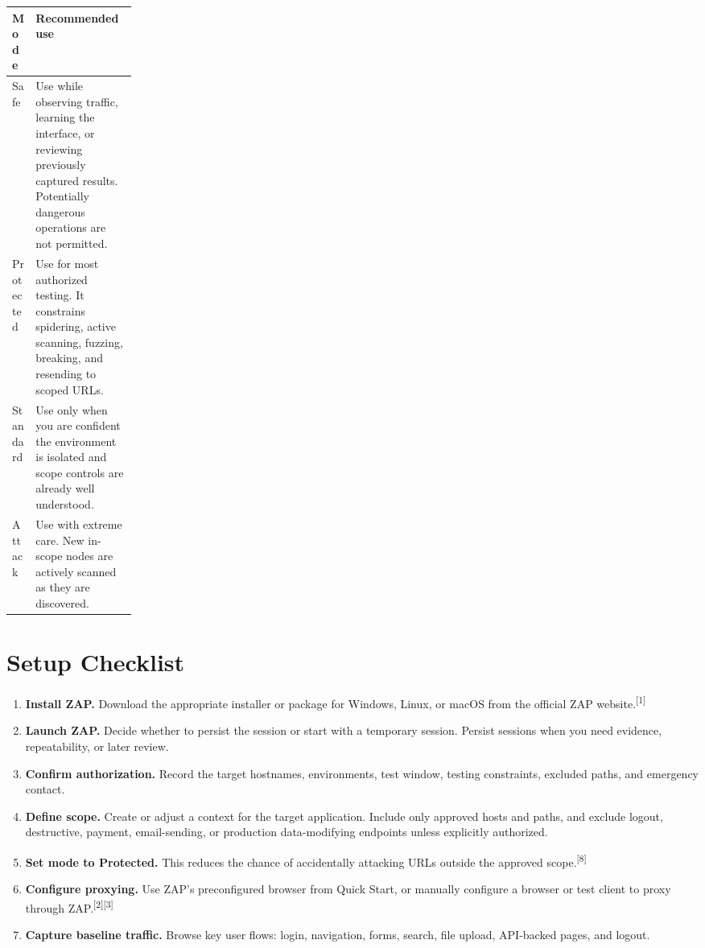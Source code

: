 \documentclass[11pt]{article}
\providecommand{\term}[1]{\textbf{#1}}
\newcommand{\source}[1]{\textsuperscript{[#1]}}
\begin{document}
\begin{tabularx}{\linewidth}{@{}p{0.18\linewidth}Y@{}}
\toprule
\textbf{Mode} & \textbf{Recommended use} \\
\midrule
Safe & Use while observing traffic, learning the interface, or reviewing previously captured results. Potentially dangerous operations are not permitted. \\
Protected & Use for most authorized testing. It constrains spidering, active scanning, fuzzing, breaking, and resending to scoped URLs. \\
Standard & Use only when you are confident the environment is isolated and scope controls are already well understood. \\
Attack & Use with extreme care. New in-scope nodes are actively scanned as they are discovered. \\
\bottomrule
\end{tabularx}

\section{Setup Checklist}

\begin{enumerate}
  \item \term{Install ZAP.} Download the appropriate installer or package for Windows, Linux, or macOS from the official ZAP website.\source{1}
  \item \term{Launch ZAP.} Decide whether to persist the session or start with a temporary session. Persist sessions when you need evidence, repeatability, or later review.
  \item \term{Confirm authorization.} Record the target hostnames, environments, test window, testing constraints, excluded paths, and emergency contact.
  \item \term{Define scope.} Create or adjust a context for the target application. Include only approved hosts and paths, and exclude logout, destructive, payment, email-sending, or production data-modifying endpoints unless explicitly authorized.
  \item \term{Set mode to Protected.} This reduces the chance of accidentally attacking URLs outside the approved scope.\source{8}
  \item \term{Configure proxying.} Use ZAP's preconfigured browser from Quick Start, or manually configure a browser or test client to proxy through ZAP.\source{2}\source{3}
  \item \term{Capture baseline traffic.} Browse key user flows: login, navigation, forms, search, file upload, API-backed pages, and logout.
\end{enumerate}
\end{document}
